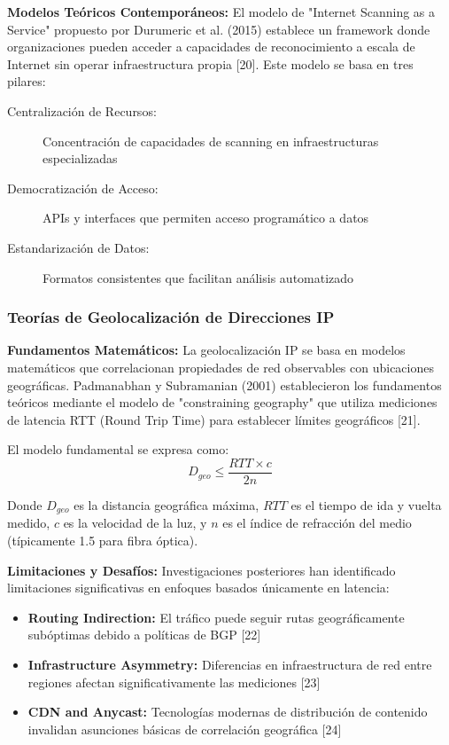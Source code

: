 \textbf{Modelos Teóricos Contemporáneos:}
El modelo de "Internet Scanning as a Service" propuesto por Durumeric et al. (2015) establece un framework donde organizaciones pueden acceder a capacidades de reconocimiento a escala de Internet sin operar infraestructura propia [20]. Este modelo se basa en tres pilares:

\begin{description}
    \item[Centralización de Recursos:] Concentración de capacidades de scanning en infraestructuras especializadas
    \item[Democratización de Acceso:] APIs y interfaces que permiten acceso programático a datos
    \item[Estandarización de Datos:] Formatos consistentes que facilitan análisis automatizado
\end{description}

\subsubsection{Teorías de Geolocalización de Direcciones IP}

\textbf{Fundamentos Matemáticos:}
La geolocalización IP se basa en modelos matemáticos que correlacionan propiedades de red observables con ubicaciones geográficas. Padmanabhan y Subramanian (2001) establecieron los fundamentos teóricos mediante el modelo de "constraining geography" que utiliza mediciones de latencia RTT (Round Trip Time) para establecer límites geográficos [21].

El modelo fundamental se expresa como:
\begin{equation}
D_{geo} \leq \frac{RTT \times c}{2n}
\end{equation}

Donde $D_{geo}$ es la distancia geográfica máxima, $RTT$ es el tiempo de ida y vuelta medido, $c$ es la velocidad de la luz, y $n$ es el índice de refracción del medio (típicamente 1.5 para fibra óptica).

\textbf{Limitaciones y Desafíos:}
Investigaciones posteriores han identificado limitaciones significativas en enfoques basados únicamente en latencia:

\begin{itemize}
    \item \textbf{Routing Indirection:} El tráfico puede seguir rutas geográficamente subóptimas debido a políticas de BGP [22]
    \item \textbf{Infrastructure Asymmetry:} Diferencias en infraestructura de red entre regiones afectan significativamente las mediciones [23]
    \item \textbf{CDN and Anycast:} Tecnologías modernas de distribución de contenido invalidan asunciones básicas de correlación geográfica [24]
\end{itemize}


